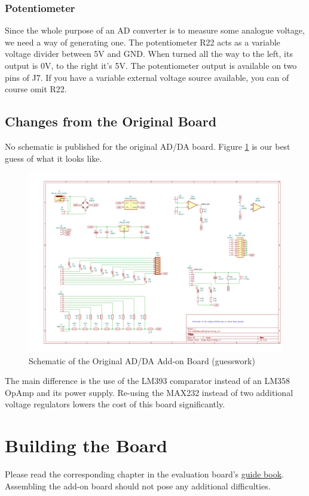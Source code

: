 \documentclass{article}
\begin{document}
\subsubsection{Potentiometer}\label{sec:poti}
Since the whole purpose of an AD converter is to measure some analogue voltage, we need a way of generating one. The potentiometer R22 acts as a variable voltage divider between 5V and GND. When turned all the way to the left, its output is 0V, to the right it's 5V. The potentiometer output is available on two pins of J7. If you have a variable external voltage source available, you can of course omit R22. 

\subsection{Changes from the Original Board}\label{sec:differences}
No schematic is published for the original AD/DA board. Figure \ref{fig:addaOrig} is our best guess of what it looks like. 

\begin{figure}[htb]
\centering
\includegraphics[width=\textwidth]{Pictures/ADDABoardOriginal.pdf}
\caption{Schematic of the Original AD/DA Add-on Board (guesswork)}
\label{fig:addaOrig}
\end{figure}

The main difference is the use of the LM393 comparator instead of an LM358 OpAmp and its power supply. Re-using the MAX232 instead of two additional voltage regulators lowers the cost of this board significantly. 

\section{Building the Board}
Please read the corresponding chapter in the evaluation board's \href{https://github.com/7vgn/EvaBoard/Guide/EvaBoardGuide.pdf}{guide book}. Assembling the add-on board should not pose any additional difficulties. 
\end{document}
